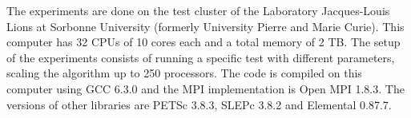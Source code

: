 The experiments are done on the test cluster of the Laboratory Jacques-Louis Lions at Sorbonne University (formerly University Pierre and Marie Curie).
This computer has 32 CPUs of 10 cores each and a total memory of 2 TB.
The setup of the experiments consists of running a specific test with different parameters, scaling the algorithm up to 250 processors.
The code is compiled on this computer using GCC 6.3.0 and the MPI implementation is Open MPI 1.8.3.
The versions of other libraries are PETSc 3.8.3, SLEPc 3.8.2 and Elemental 0.87.7.
